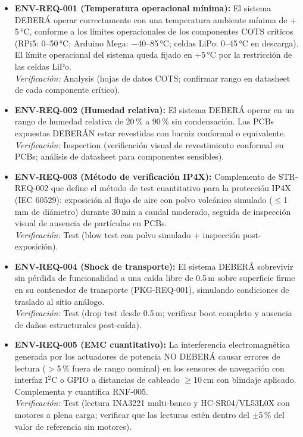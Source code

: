\begin{itemize}
    \item \textbf{ENV-REQ-001 (Temperatura operacional mínima):} El sistema DEBERÁ operar correctamente con una temperatura ambiente mínima de $+$5\,°C, conforme a los límites operacionales de los componentes COTS críticos (RPi5: 0–50\,°C; Arduino Mega: $-$40–85\,°C; celdas LiPo: 0–45\,°C en descarga). El límite operacional del sistema queda fijado en $+$5\,°C por la restricción de las celdas LiPo. \\
    \textit{Verificación:} Analysis (hojas de datos COTS; confirmar rango en datasheet de cada componente crítico).

    \item \textbf{ENV-REQ-002 (Humedad relativa):} El sistema DEBERÁ operar en un rango de humedad relativa de 20\,\% a 90\,\% sin condensación. Las PCBs expuestas DEBERÁN estar revestidas con barniz conformal o equivalente. \\
    \textit{Verificación:} Inspection (verificación visual de revestimiento conformal en PCBs; análisis de datasheet para componentes sensibles).

    \item \textbf{ENV-REQ-003 (Método de verificación IP4X):} Complemento de STR-REQ-002 que define el método de test cuantitativo para la protección IP4X (IEC 60529): exposición al flujo de aire con polvo volcánico simulado ($\le$1\,mm de diámetro) durante 30\,min a caudal moderado, seguida de inspección visual de ausencia de partículas en PCBs. \\
    \textit{Verificación:} Test (blow test con polvo simulado + inspección post-exposición).

    \item \textbf{ENV-REQ-004 (Shock de transporte):} El sistema DEBERÁ sobrevivir sin pérdida de funcionalidad a una caída libre de 0.5\,m sobre superficie firme en su contenedor de transporte (PKG-REQ-001), simulando condiciones de traslado al sitio análogo. \\
    \textit{Verificación:} Test (drop test desde 0.5\,m; verificar boot completo y ausencia de daños estructurales post-caída).

    \item \textbf{ENV-REQ-005 (EMC cuantitativo):} La interferencia electromagnética generada por los actuadores de potencia NO DEBERÁ causar errores de lectura ($>$5\,\% fuera de rango nominal) en los sensores de navegación con interfaz I$^2$C o GPIO a distancias de cableado $\ge$10\,cm con blindaje aplicado. Complementa y cuantifica RNF-005. \\
    \textit{Verificación:} Test (lectura INA3221 multi-banco y HC-SR04/VL53L0X con motores a plena carga; verificar que las lecturas estén dentro del $\pm$5\,\% del valor de referencia sin motores).
\end{itemize}

